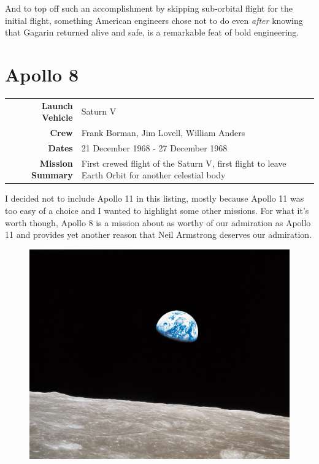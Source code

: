 \documentclass{article}
\begin{document}
  And to top off such an
  accomplishment by skipping sub-orbital flight for the initial flight, something
  American engineers chose not to do even \textit{after} knowing that Gagarin returned
  alive and safe, is a remarkable feat of bold engineering.

  \section{Apollo 8}

  \begin{center}
    \begin{tabular}{ >{\bfseries}r | p{3.5in} }
      \hline
      Launch Vehicle & Saturn V \\
      Crew & Frank Borman,
             Jim Lovell,
             William Anders \\
      Dates & 21 December 1968 - 27 December 1968 \\
      Mission Summary & First crewed flight of the Saturn V, first flight to
      leave Earth Orbit for another celestial body \\
      \hline
    \end{tabular}
  \end{center}

  I decided not to include Apollo 11 in this listing, mostly because Apollo 11 was
  too easy of a choice and I wanted to highlight some other missions. For what
  it's worth though, Apollo 8 is a mission about as worthy of our admiration as
  Apollo 11 and provides yet another reason that Neil Armstrong deserves our
  admiration.

  \begin{figure}
    \includegraphics[width=0.9\linewidth]{earthrise.jpg}
  \end{figure}
\end{document}
